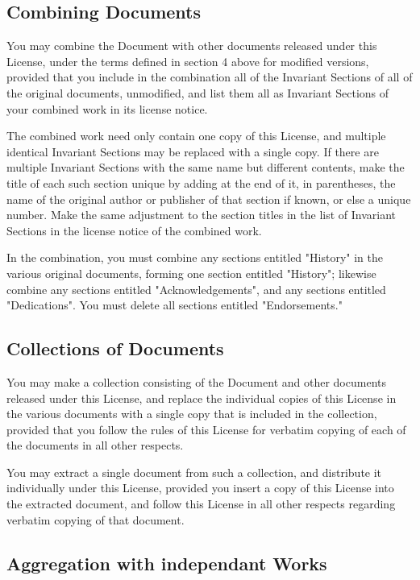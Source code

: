 	\subsection{Combining Documents}

	You may combine the Document with other documents released under this License, under the terms defined in section 4 above for modified versions, provided that you include in the combination all of the Invariant Sections of all of the original documents, unmodified, and list them all as Invariant Sections of your combined work in its license notice. 

	The combined work need only contain one copy of this License, and multiple identical Invariant Sections may be replaced with a single copy. If there are multiple Invariant Sections with the same name but different contents, make the title of each such section unique by adding at the end of it, in parentheses, the name of the original author or publisher of that section if known, or else a unique number. Make the same adjustment to the section titles in the list of Invariant Sections in the license notice of the combined work. 

	In the combination, you must combine any sections entitled "History" in the various original documents, forming one section entitled "History"; likewise combine any sections entitled "Acknowledgements", and any sections entitled "Dedications". You must delete all sections entitled "Endorsements." 

	\subsection{Collections of Documents}

	You may make a collection consisting of the Document and other documents released under this License, and replace the individual copies of this License in the various documents with a single copy that is included in the collection, provided that you follow the rules of this License for verbatim copying of each of the documents in all other respects. 

	You may extract a single document from such a collection, and distribute it individually under this License, provided you insert a copy of this License into the extracted document, and follow this License in all other respects regarding verbatim copying of that document. 

	\subsection{Aggregation with independant Works} 

